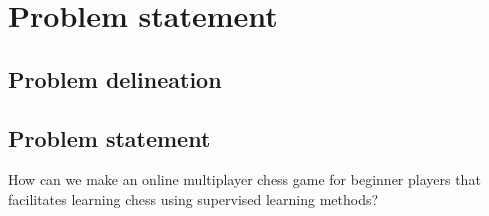 \chapter{Problem statement}\label{ch:problem-statement}

\section{Problem delineation}\label{sec:problem-delineation}

\section{Problem statement}\label{sec:problem-statement}

How can we make an online multiplayer chess game for beginner players that facilitates learning chess using supervised
learning methods?

